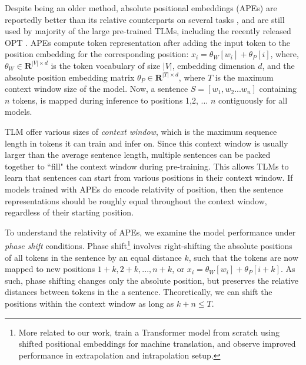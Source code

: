 \documentclass[letterpaper, 12pt]{report}
\begin{document}


Despite being an older method, absolute positional embeddings (APEs) are reportedly better than its relative counterparts on several tasks \citep{ravishankar-etal-2021-multilingual}, and are still used by majority of the large pre-trained TLMs, including the recently released OPT \cite{Zhang2022:OPT}.
APEs compute token representation after adding the input token to the position embedding for the corresponding position: $x_i = \theta_{W}[w_i] + \theta_{P}[i]$,
where, $\theta_W \in \mathbf{R}^{|V| \times d}$ is the token vocabulary of size $|V|$, embedding dimension $d$, and the absolute position embedding matrix $\theta_P \in \mathbf{R}^{|T|\times d}$, where $T$ is the maximum context window size of the model.
Now, a sentence $S=[w_1,w_2 ... w_n]$ containing $n$ tokens, is mapped during inference to positions 1,2, ... $n$ contiguously for all models.

TLM offer various sizes of \textit{context window}, which is the maximum sequence length in tokens it can train and infer on.
Since this context window is usually larger than the average sentence length, multiple sentences can be packed together to ``fill" the context window during pre-training.
This allows TLMs to learn that sentences can start from various positions in their context window. If models trained with APEs do encode relativity of position, then the sentence representations should be roughly equal throughout the context window, regardless of their starting position.

To understand the relativity of APEs, we examine the model performance under \textit{phase shift} conditions.
Phase shift\footnote{More related to our work, \citet{kiyono2021} train a Transformer model from scratch using shifted positional embeddings for machine translation, and observe improved performance in extrapolation and intrapolation setup.} involves right-shifting the absolute positions of all tokens in the sentence by an equal distance $k$, such that the tokens are now mapped to new positions $1+k, 2+k, ... , n+k$, or $x_i = \theta_{W}[w_i] + \theta_{P}[i+k]$.
As such, phase shifting changes only the absolute position, but preserves the relative distances between tokens in the a sentence.
Theoretically, we can shift the positions within the context window as long as $k+n \leq T$. %
\end{document}
